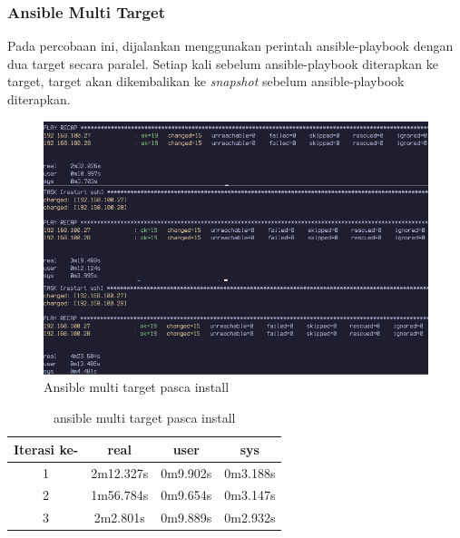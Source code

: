 \documentclass[10pt,]{report}
\begin{document}
\begin{adjustwidth}{20pt}{}
	\subsubsection{Ansible Multi Target}
	\begin{adjustwidth}{20pt}{}
		Pada percobaan ini, dijalankan menggunakan perintah ansible-playbook dengan dua
		target secara paralel. Setiap kali sebelum ansible-playbook diterapkan ke target,
		target akan dikembalikan ke \textit{snapshot} sebelum ansible-playbook diterapkan.
		\begin{figure}[H]
			\begin{center}
				\includegraphics[width=\textwidth]{images/ansible/multi/ansible-pasca-multi-com.png}
			\end{center}
			\caption{Ansible multi target pasca install}
		\end{figure}
		\begin{table}[H]
			\caption{ansible multi target pasca install}
			\begin{center}
				\begin{tabular}[c]{|c|c|c|c|}
					\hline
					\multicolumn{1}{|c|}{\textbf{Iterasi ke-}} &
					\multicolumn{1}{c|}{\textbf{real}}         &
					\multicolumn{1}{c|}{\textbf{user}}         &
					\multicolumn{1}{c|}{\textbf{sys}}                                            \\
					\hline
					1                                          & 2m12.327s & 0m9.902s & 0m3.188s \\
					\hline
					2                                          & 1m56.784s & 0m9.654s & 0m3.147s \\
					\hline
					3                                          & 2m2.801s  & 0m9.889s & 0m2.932s \\
					\hline
				\end{tabular}
			\end{center}
		\end{table}
	\end{adjustwidth}

\end{adjustwidth}
\end{document}
